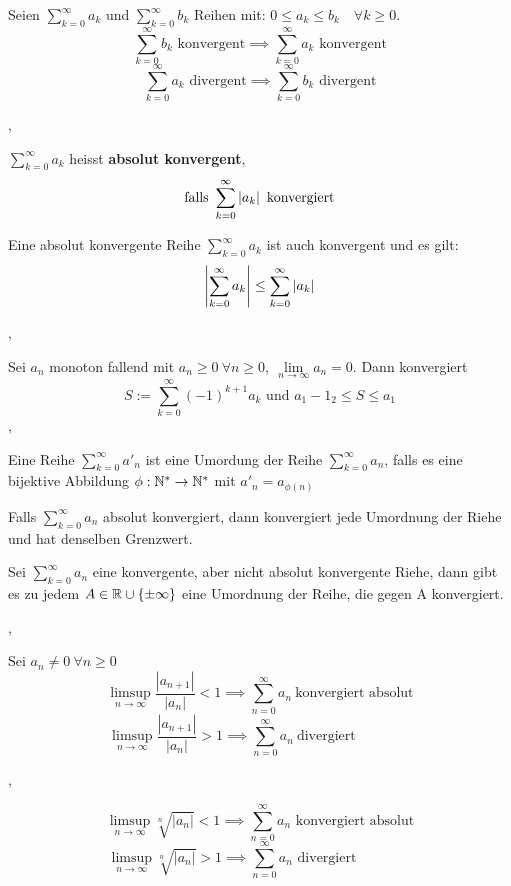 \Korollar[2.7.7 (Vergleichssatz)] Seien $\sum_{k=0}^{\infty} a_{k}$ und $\sum_{k=0}^{\infty} b_{k}$ Reihen mit: $0 \leq a_{k} \leq b_{k} \quad \forall k \geq 0. $
\[ \sum_{k=0}^{\infty} b_{k} \text{ konvergent} \implies \sum_{k=0}^{\infty} a_{k} \text{ konvergent} \]
\[ \sum_{k=0}^{\infty} a_{k} \text{ divergent} \implies \sum_{k=0}^{\infty} b_{k} \text{ divergent} \]

\sep

\Satz[2.7.9] $\sum_{k=0}^{\infty} a_{k}$ heisst \textbf{absolut konvergent}, 
\[ \text{falls } \sum_{k=0}^{\infty} \left\lvert a_{k} \right\rvert \text{ konvergiert} \]

\Satz[2.7.10] Eine absolut konvergente Reihe $\sum_{k=0}^{\infty} a_{k}$ ist auch konvergent und es gilt:
\[ \left\lvert \sum_{k=0}^{\infty} a_{k} \right\rvert \leq \sum_{k=0}^{\infty} \left\lvert a_{k} \right\rvert\]

\sep

\Satz[2.7.12 Leibniz] Sei $a_{n}$ monoton fallend mit $a_{n} \geq 0 \ \forall n \geq 0, \ \lim\limits_{n \rightarrow \infty} a_{n} = 0.$ Dann konvergiert
\[ S :=  \sum_{k=0}^{\infty} (-1)^{k+1} a_{k} \text{ und } a_{1} - 1_{2} \leq S \leq {a_1} \]
\sep

\Def[2.7.14] Eine Reihe  $\sum_{k=0}^{\infty} a'_{n}$ ist eine Umordung der Reihe  $\sum_{k=0}^{\infty} a_{n}$, falls es eine bijektive Abbildung $\phi : \mathbb{N}^{*} \rightarrow \mathbb{N}^{*}$ mit $a'_{n} = a_{\phi(n)}$ 

\Satz[2.7.16 Dirichlet] Falls $\sum_{k=0}^{\infty} a_{n}$ absolut konvergiert, dann konvergiert jede Umordnung der Riehe und hat denselben Grenzwert.  

\Satz[Riemann] Sei $\sum_{k=0}^{\infty} a_{n}$ eine konvergente, aber nicht absolut konvergente Riehe, dann gibt es zu jedem $A \in \mathbb{R} \cup \{\pm \infty\}$ eine Umordnung der Reihe, die gegen A konvergiert. 

\sep

\Satz[Quotientenkriterium] Sei $a_{n} \neq 0 \ \forall n \geq 0$
\[\limsup\limits_{n \rightarrow \infty} \frac{\left|a_{n+1}\right|}{\left|a_{n}\right|}<1 \implies \sum_{n=0}^{\infty} a_{n} \ \text{konvergiert absolut}\]
\[\limsup\limits_{n \rightarrow \infty} \frac{\left|a_{n+1}\right|}{\left|a_{n}\right|}>1 \implies \sum_{n=0}^{\infty} a_{n} \ \text{divergiert} \quad \quad \quad \quad\]

\sep

\Satz[Wurzelkriterium] 
\[\limsup\limits_{n \rightarrow \infty} \sqrt[n]{\left|a_{n}\right|}<1 \implies \sum_{n=0}^{\infty} a_{n} \text{ konvergiert absolut} \]
\[\limsup\limits_{n \rightarrow \infty} \sqrt[n]{\left|a_{n}\right|}>1 \implies \sum_{n=0}^{\infty} a_{n} \text{ divergiert} \quad \quad \quad \quad \]


